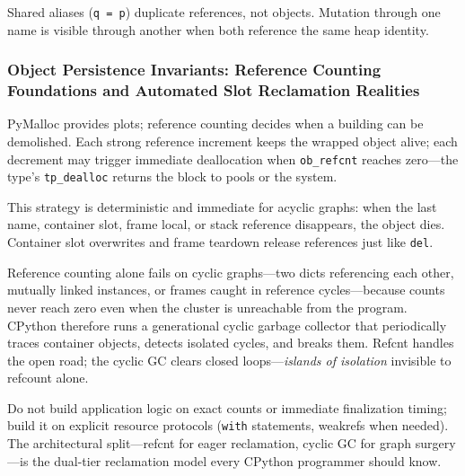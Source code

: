 Shared aliases (\texttt{q = p}) duplicate references, not objects. Mutation through one name is visible through another when both reference the same heap identity.

\subsubsection{Object Persistence Invariants: Reference Counting Foundations and Automated Slot Reclamation Realities}

PyMalloc provides plots; reference counting decides when a building can be demolished. Each strong reference increment keeps the wrapped object alive; each decrement may trigger immediate deallocation when \texttt{ob\_refcnt} reaches zero---the type's \texttt{tp\_dealloc} returns the block to pools or the system.

This strategy is deterministic and immediate for acyclic graphs: when the last name, container slot, frame local, or stack reference disappears, the object dies. Container slot overwrites and frame teardown release references just like \texttt{del}.

Reference counting alone fails on cyclic graphs---two dicts referencing each other, mutually linked instances, or frames caught in reference cycles---because counts never reach zero even when the cluster is unreachable from the program. CPython therefore runs a generational cyclic garbage collector that periodically traces container objects, detects isolated cycles, and breaks them. Refcnt handles the open road; the cyclic GC clears closed loops---\emph{islands of isolation} invisible to refcount alone.

Do not build application logic on exact counts or immediate finalization timing; build it on explicit resource protocols (\texttt{with} statements, weakrefs when needed). The architectural split---refcnt for eager reclamation, cyclic GC for graph surgery---is the dual-tier reclamation model every CPython programmer should know.
